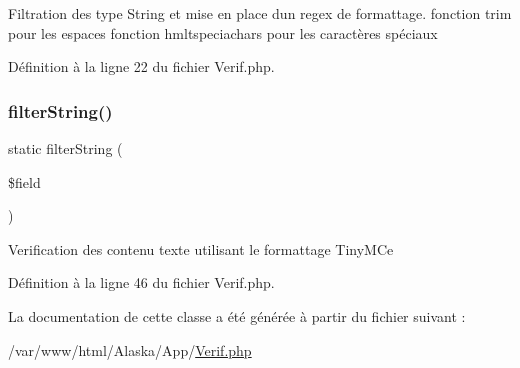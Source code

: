 Filtration des type String et mise en place d\textquotesingle{}un regex de formattage. fonction trim pour les espaces fonction hmltspeciachars pour les caractères spéciaux 

Définition à la ligne 22 du fichier Verif.\+php.

\mbox{\label{class_app_1_1_verif_a99f773813353109ce02b4796ddd49467}} 
\subsubsection{\texorpdfstring{filter\+String()}{filterString()}}
{\footnotesize\ttfamily static filter\+String (\begin{DoxyParamCaption}\item[{}]{\$field }\end{DoxyParamCaption})\hspace{0.3cm}{\ttfamily [static]}}

Verification des contenu texte utilisant le formattage Tiny\+M\+Ce 

Définition à la ligne 46 du fichier Verif.\+php.



La documentation de cette classe a été générée à partir du fichier suivant \+:\begin{DoxyCompactItemize}
\item 
/var/www/html/\+Alaska/\+App/\hyperlink{_verif_8php}{Verif.\+php}\end{DoxyCompactItemize}
